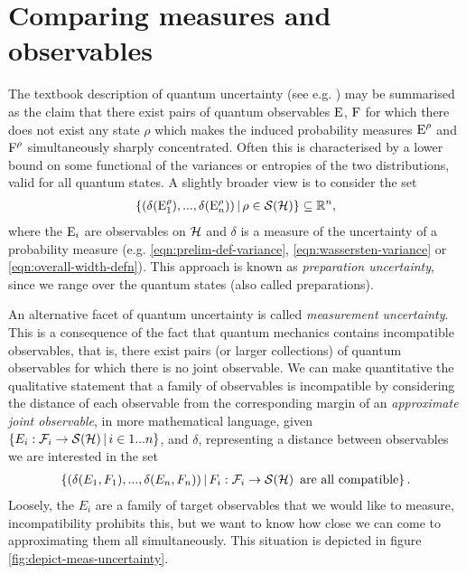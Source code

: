 \section{Comparing measures and observables}
\label{sec:comp-measures-and-dists}

The textbook description of quantum uncertainty (see e.g. \cite{Nielsen-Chuang}) may be summarised as the claim that there exist pairs of quantum observables $\operatorname{E}$, $\operatorname{F}$ for which there does not exist any state $\rho$ which makes the induced probability measures $\operatorname{E}^\rho$ and $\operatorname{F}^\rho$ simultaneously sharply concentrated. Often this is characterised by a lower bound on some functional of the variances or entropies \cites{MaassenUffink1988}{Wehner_2010} of the two distributions, valid for all quantum states. A slightly broader view is to consider the set
\begin{align}
  \sbuild{\left(\delta(\ope_1^\rho),...,\delta(\ope_n^\rho)\right)}{\rho\in\dops[\hcal]} \subseteq \R^n,
\end{align}
where the $\operatorname{E}_i$ are observables on $\mathcal{H}$ and $\delta$ is a measure of the uncertainty of a probability measure (e.g. \eqref{eqn:prelim-def-variance}, \eqref{eqn:wassersten-variance} or \eqref{eqn:overall-width-defn}). This approach is known as \emph{preparation uncertainty}, since we range over the quantum states (also called preparations).

An alternative facet of quantum uncertainty is called \emph{measurement uncertainty}. This is a consequence of the fact that quantum mechanics contains incompatible observables, that is, there exist pairs (or larger collections) of quantum observables for which there is no joint observable. We can make quantitative the qualitative statement that a family of observables is incompatible by considering the distance of each observable from the corresponding margin of an \emph{approximate joint observable}, in more mathematical language, given $\sbuild{E_i:\fcal_i\to\dops[\hcal]}{i\in 1...n}$, and $\delta$, representing a distance between observables we are interested in the set
\begin{align}
  \sbuild{\left(\delta(E_1, F_1),...,\delta(E_n, F_n)\right)}{F_i:\fcal_i\to\dops[\hcal]  \text{ are all compatible}}.
\end{align}
Loosely, the $E_i$ are a family of target observables that we would like to measure, incompatibility prohibits this, but we want to know how close we can come to approximating them all simultaneously. This situation is depicted in figure \ref{fig:depict-meas-uncertainty}.

